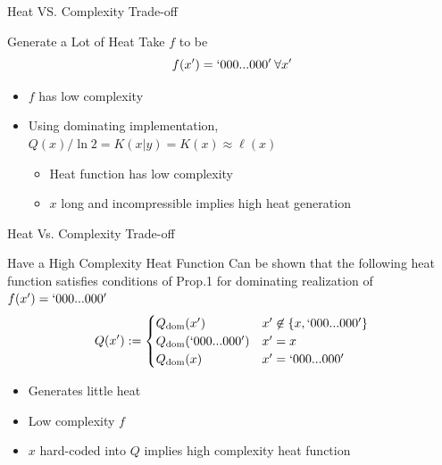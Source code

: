 \documentclass{beamer}
\begin{document}
\begin{frame}{Heat VS. Complexity Trade-off}
    \begin{block}{Generate a Lot of Heat}
    Take $f$ to be
    \begin{equation*}
        f(x') = `000...000' \:\forall x'
    \end{equation*}
    \begin{itemize}
        \item $f$ has low complexity
        \item Using dominating implementation, $Q(x)/\ln 2 = K(x|y) = K(x)\approx \ell(x)$
        \begin{itemize}
            \item Heat function has low complexity
            \item $x$ long and incompressible implies high heat generation
        \end{itemize}
    \end{itemize}
    \end{block}
\end{frame}
\begin{frame}{Heat Vs. Complexity Trade-off}
\begin{block}{Have a High Complexity Heat Function}
Can be shown that the following heat function satisfies conditions of Prop.1 for dominating realization of $f(x') = `000...000'$
\begin{equation*}
    Q(x') := \begin{cases} Q_\text{dom}(x') &x'\not\in \{x,`000...000'\}\\
    Q_\text{dom}(`000...000') &x' =x\\
    Q_\text{dom}(x) &x' = `000...000'\end{cases}
\end{equation*}
\begin{itemize}
    \item Generates little heat
    \item Low complexity $f$
    \item $x$ hard-coded into $Q$ implies high complexity heat function
\end{itemize}
\end{block}
\end{frame}
\end{document}
